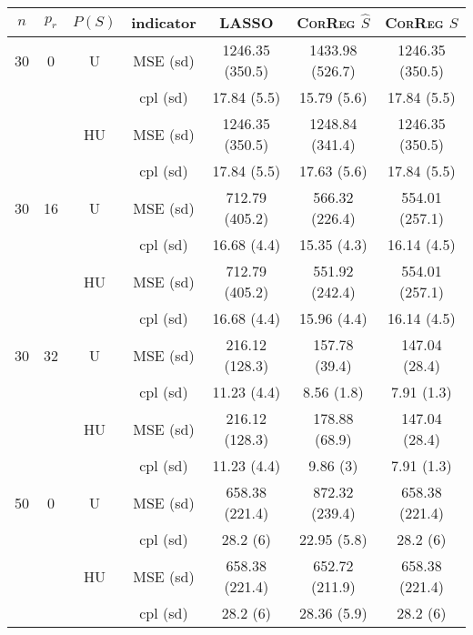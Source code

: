 \documentclass[11pt,a4paper]{article}
\begin{document}
\begin{table}[h!]
\centering
\begin{tabular}{|c|c|c|c|c|c|c|}
\hline 
$n$ & $p_r$&  $P(S)$ &indicator &LASSO  &    \textsc{CorReg} $\hat S$& \textsc{CorReg} $S$\\ 
\hline %
30 & 0 & U&MSE (sd) & 1246.35 (350.5) & 1433.98 (526.7) & 1246.35 (350.5) \\
& & & cpl (sd) & 17.84 (5.5) & 15.79 (5.6) & 17.84 (5.5) \\
 &  &HU &MSE (sd) & 1246.35 (350.5) & 1248.84 (341.4) & 1246.35 (350.5) \\
& & & cpl (sd) & 17.84 (5.5) & 17.63 (5.6) & 17.84 (5.5) \\ 
\hline %
30 &16& U & MSE (sd) & 712.79 (405.2) & 566.32 (226.4) & 554.01 (257.1) \\
& & & cpl (sd) & 16.68 (4.4) & 15.35 (4.3) & 16.14 (4.5) \\
 &  & HU & MSE (sd) & 712.79 (405.2) & 551.92 (242.4) & 554.01 (257.1) \\
& & & cpl (sd) & 16.68 (4.4) & 15.96 (4.4) & 16.14 (4.5) \\
\hline %
30 & 32 & U & MSE (sd) & 216.12 (128.3) & 157.78 (39.4) & 147.04 (28.4) \\
& & & cpl (sd) & 11.23 (4.4) & 8.56 (1.8) & 7.91 (1.3) \\
 &  & HU & MSE (sd) & 216.12 (128.3) & 178.88 (68.9) & 147.04 (28.4) \\
& & & cpl (sd) & 11.23 (4.4) & 9.86 (3) & 7.91 (1.3) \\
\hline
\hline %
50 & 0 & U&MSE (sd) & 658.38 (221.4) & 872.32 (239.4) & 658.38 (221.4) \\
& & & cpl (sd) & 28.2 (6) & 22.95 (5.8) & 28.2 (6) \\
 &  & HU &MSE (sd) & 658.38 (221.4) & 652.72 (211.9) & 658.38 (221.4) \\
& & & cpl (sd) & 28.2 (6) & 28.36 (5.9) & 28.2 (6) \\

\end{tabular}
\end{table}
\end{document}
